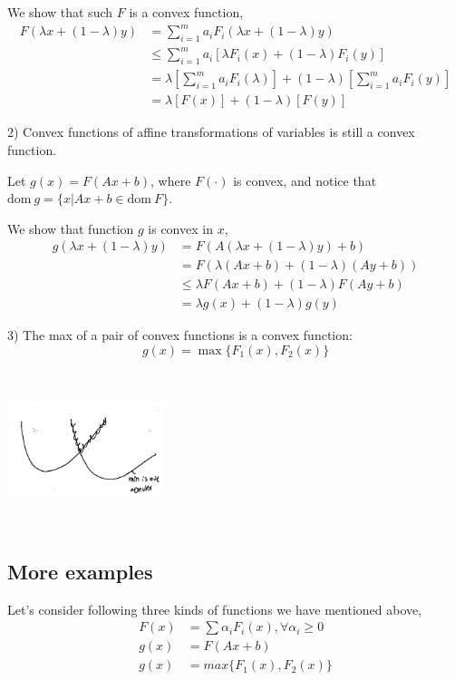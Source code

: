 We show that such $F$ is a convex function,
\begin{align*}
F(\lambda x + (1-\lambda)y) 
&= \sum^m_{i=1}a_iF_i(\lambda x + (1-\lambda)y)\\
&\leq \sum^m_{i=1}a_i[\lambda F_i(x) + (1-\lambda)F_i(y)]\\
&= \lambda[\sum^m_{i=1}a_iF_i(\lambda)] + (1-\lambda)[\sum^m_{i=1}a_iF_i(y)]\\
&= \lambda[F(x)] + (1-\lambda)[F(y)]
\end{align*}

2) Convex functions of affine transformations of variables is still a convex function.

Let $g(x) =F(Ax + b)$, where $F(\cdot)$ is convex, and notice that $\text{dom}\ g = \{x|Ax + b \in\text{dom}\ F \}$. 

We show that function $g$ is convex in $x$,
\begin{align*}
g(\lambda x + (1-\lambda)y) &= F(A(\lambda x + (1-\lambda)y) + b)\\
&= F(\lambda(Ax + b) + (1-\lambda)(Ay+b))\\
&\leq \lambda F(Ax + b) + (1-\lambda)F(Ay+b)\\
&= \lambda g(x) + (1-\lambda)g(y)
\end{align*}


3) The max of a pair of convex functions is a convex function:
\begin{equation*}
g(x) = \max\{F_1(x), F_2(x) \}
\end{equation*}


\begin{marginfigure}
	\centering
	\includegraphics[width=1.8in,height=1.8in]{figures/ch08/figure1030_14.png}
\end{marginfigure}




\subsection{More examples}
Let's consider following three kinds of functions we have mentioned above,
\begin{align*}
F(x) &=\sum\alpha_iF_i(x), \forall \alpha_i\geq 0\\
g(x) &= F(Ax + b)\\
g(x) &= max\{F_1(x), F_2(x) \}
\end{align*}

